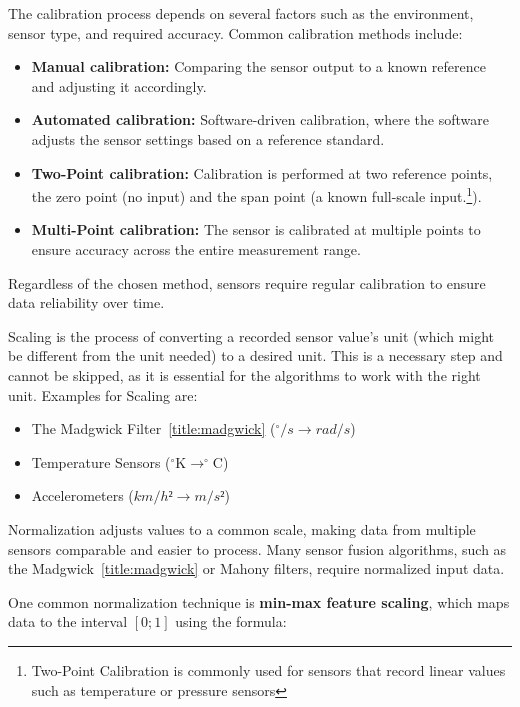The calibration process depends on several factors such as the environment, sensor type, and required accuracy. Common calibration methods include:
\begin{itemize}
    \item \textbf{Manual calibration:} Comparing the sensor output to a known reference and adjusting it accordingly.
    \item \textbf{Automated calibration:} Software-driven calibration, where the software adjusts the sensor settings based on a reference standard.
    \item \textbf{Two-Point calibration:} Calibration is performed at two reference points, the zero point (no input) and the span point (a known full-scale input.\footnote{Two-Point Calibration is commonly used for sensors that record linear values such as temperature or pressure sensors}).
    \item \textbf{Multi-Point calibration:} The sensor is calibrated at multiple points to ensure accuracy across the entire measurement range.
\end{itemize}

Regardless of the chosen method, sensors require regular calibration to ensure data reliability over time.\ \cite{LRWeb:25}

Scaling is the process of converting a recorded sensor value's unit (which might be different from the unit needed) to a desired unit. This is a necessary step and cannot be skipped, as it is essential for the algorithms to work with the right unit. Examples for Scaling are:
\begin{itemize}
    \item The Madgwick Filter~\ref{title:madgwick} ($^\circ/s \rightarrow rad/s$)
    \item Temperature Sensors ($^\circ\mathrm{K} \rightarrow ^\circ\mathrm{C}$)
    \item Accelerometers ($km/h² \rightarrow m/s²$)
\end{itemize}
\noindent\cite{LRWeb:22}

Normalization adjusts values to a common scale, making data from multiple sensors comparable and easier to process. Many sensor fusion algorithms, such as the Madgwick~\ref{title:madgwick} or Mahony filters, require normalized input data.

One common normalization technique is \textbf{min-max feature scaling}, which maps data to the interval $[0; 1]$ using the formula:

